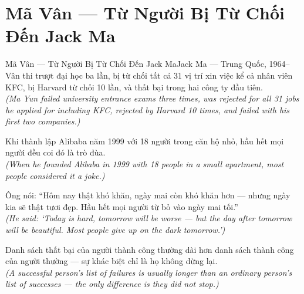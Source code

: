 \section{Mã Vân --- Từ Người Bị Từ Chối Đến Jack Ma}
\begin{truyen}{Mã Vân --- Từ Người Bị Từ Chối Đến Jack Ma}{Jack Ma --- Trung Quốc, 1964--}
 Vân thi trượt đại học ba lần, bị từ chối tất cả 31 vị trí xin việc kể cả nhân viên KFC, bị Harvard từ chối 10 lần, và thất bại trong hai công ty đầu tiên.\\[4pt]
\textit{(Ma Yun failed university entrance exams three times, was rejected for all 31 jobs he applied for including KFC, rejected by Harvard 10 times, and failed with his first two companies.)}

Khi thành lập Alibaba năm 1999 với 18 người trong căn hộ nhỏ, hầu hết mọi người đều coi đó là trò đùa.\\[4pt]
\textit{(When he founded Alibaba in 1999 with 18 people in a small apartment, most people considered it a joke.)}

Ông nói: ``Hôm nay thật khó khăn, ngày mai còn khó khăn hơn --- nhưng ngày kia sẽ thật tươi đẹp. Hầu hết mọi người từ bỏ vào ngày mai tối.''\\[4pt]
\textit{(He said: `Today is hard, tomorrow will be worse --- but the day after tomorrow will be beautiful. Most people give up on the dark tomorrow.')}

\end{truyen}
\begin{baihoc}
  Danh sách thất bại của người thành công thường dài hơn danh sách thành công của người thường --- sự khác biệt chỉ là họ không dừng lại.\\[4pt]
  \textit{(A successful person's list of failures is usually longer than an ordinary person's list of successes --- the only difference is they did not stop.)}
\end{baihoc}

